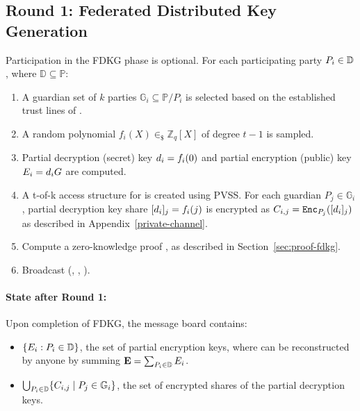 \documentclass[runningheads]{llncs}
\begin{document}
\subsection{Round 1: Federated Distributed Key Generation}
Participation in the FDKG phase is optional. For each participating party $P_{i} \in \mathbb{D}$, where $\mathbb{D} \subseteq  \mathbb{P}$:
\begin{enumerate}
    \item A guardian set of $k$ parties $\mathbb{G}_i\subseteq \mathbb{P}/P_i$ is selected based on the established trust lines of .
    \item A random polynomial $f_{i}(X) \in_{\$} \mathbb{Z}_q[X]$ of degree $t-1$ is sampled.
    \item Partial decryption (secret) key $d_{i}= f_i(0)$ and partial encryption (public) key $E_{i} = d_{i} G$ are computed.
    \item A t-of-k access structure for  is created using PVSS. For each guardian $P_{j} \in \mathbb{G}_i$, partial decryption key share $[d_{i}]_{j}=f_i(j)$ is encrypted as $C_{i,j}=\texttt{Enc}_{P_{j}}([d_{i}]_{j})$ as described in Appendix~\ref{private-channel}.
    
    \item Compute a zero-knowledge proof , as described in Section~\ref{sec:proof-fdkg}.
    
    \item Broadcast (, , ).
\end{enumerate}

\paragraph*{State after Round 1:}
Upon completion of FDKG, the message board contains:
\begin{itemize}
    \item $\{E_{i} : P_{i} \in \mathbb{D}\}$, the set of partial encryption keys, where \EncryptionKey{} can be reconstructed by anyone by summing $\textbf{E}=\sum_{P_{i} \in \mathbb{D}} E_{i}$.
    \item $\bigcup_{P_{i} \in \mathbb{D}} \{C_{i,j} \mid P_j \in \mathbb{G}_i\}$, the set of encrypted shares of the partial decryption keys.  
\end{itemize}
\end{document}
